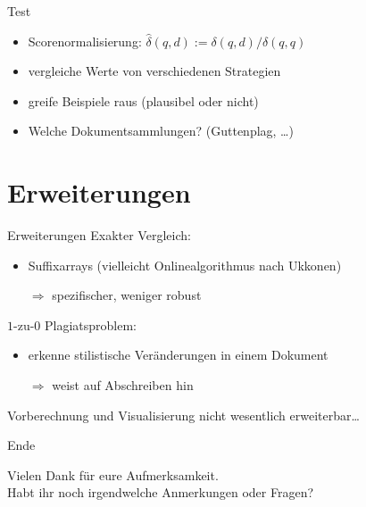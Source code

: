 \documentclass[german,simple]{mybeamer}
\begin{document}
\begin{frame}{Test}
\begin{itemize}

  \item Scorenormalisierung: $\widehat{\delta}(q, d) := \delta(q, d) / \delta(q, q)$
  \item vergleiche Werte von verschiedenen Strategien
  \item greife Beispiele raus (plausibel oder nicht)
  \item Welche Dokumentsammlungen? (Guttenplag, \dots)
\end{itemize}
\end{frame}

\section{Erweiterungen}

\begin{frame}{Erweiterungen}
  Exakter Vergleich:
  \begin{itemize}
    \item Suffixarrays (vielleicht Onlinealgorithmus nach Ukkonen)
    \item[$\Rightarrow$] spezifischer, weniger robust
  \end{itemize}
  \pause
  $1$-zu-$0$ Plagiatsproblem:
  \begin{itemize}
    \item erkenne stilistische Veränderungen in einem Dokument 
    \item[$\Rightarrow$] weist auf Abschreiben hin
  \end{itemize}
  \pause
  Vorberechnung und Visualisierung nicht wesentlich erweiterbar\dots
\end{frame}

\begin{frame}{Ende}
\vfill
\begin{center}
Vielen Dank für eure Aufmerksamkeit.\\
Habt ihr noch irgendwelche Anmerkungen oder Fragen?
\end{center}
\vfill
\end{frame}
\end{document}
